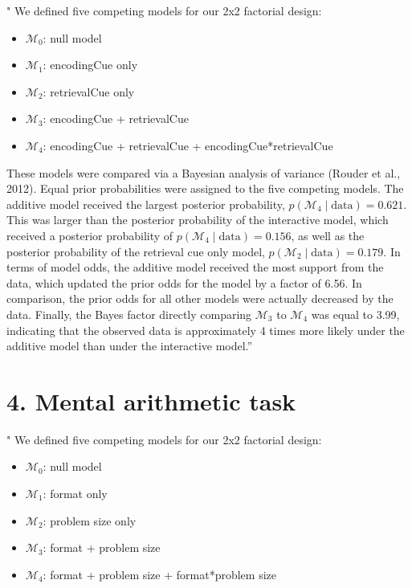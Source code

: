 \documentclass[11pt]{article}
\begin{document}
" We defined five competing models for our 2x2 factorial design:
\begin{itemize}
\item \(\mathcal{M}_0\): null model
\item \(\mathcal{M}_1\): encodingCue only
\item \(\mathcal{M}_2\): retrievalCue only
\item \(\mathcal{M}_3\): encodingCue + retrievalCue
\item \(\mathcal{M}_4\): encodingCue + retrievalCue + encodingCue*retrievalCue
\end{itemize}

These models were compared via a Bayesian analysis of variance (Rouder et al., 2012).  Equal prior probabilities were assigned to the five competing models.  The additive model received the largest posterior probability, \(p(\mathcal{M}_4\mid \text{data}) = 0.621\).  This was larger than the posterior probability of the interactive model, which received a posterior probability of \(p(\mathcal{M}_4\mid \text{data})=0.156\), as well as the posterior probability of the retrieval cue only model, \(p(\mathcal{M}_2\mid \text{data})=0.179\). In terms of model odds, the additive model received the most support from the data, which updated the prior odds for the model by a factor of 6.56.  In comparison, the prior odds for all other models were actually decreased by the data.  Finally, the Bayes factor directly comparing \(\mathcal{M}_3\) to \(\mathcal{M}_4\) was equal to 3.99, indicating that the observed data is approximately 4 times more likely under the additive model than under the interactive model.''


\section*{4. Mental arithmetic task}
\label{sec:orga9838f0}

" We defined five competing models for our 2x2 factorial design:
\begin{itemize}
\item \(\mathcal{M}_0\): null model
\item \(\mathcal{M}_1\): format only
\item \(\mathcal{M}_2\): problem size only
\item \(\mathcal{M}_3\): format + problem size
\item \(\mathcal{M}_4\): format + problem size + format*problem size
\end{itemize}
\end{document}
